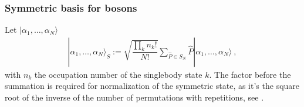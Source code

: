 \documentclass[letterpaper,10pt,english]{jupyterBook}
\begin{document}
\subsubsection{Symmetric basis for bosons}
\label{\detokenize{ch/quantum-mechanics/many-body/identical-systems:symmetric-basis-for-bosons}}\label{\detokenize{ch/quantum-mechanics/many-body/identical-systems:quantum-mechanics-second-quantizazion-identical-symmetrization-bosons}}
\sphinxAtStartPar
Let \(| \alpha_1, \dots, \alpha_N \rangle\)
\begin{equation*}
\begin{split}| \alpha_1, \dots, \alpha_N \rangle_S := \sqrt{ \dfrac{\prod_k n_k!}{N!} } \sum_{\hat{P} \in S_N} \hat{P} | \alpha_1, \dots, \alpha_N \rangle \ ,\end{split}
\end{equation*}
\sphinxAtStartPar
with \(n_k\) the occupation number of the single\sphinxhyphen{}body state \(k\). The factor before the summation is required for normalization of the symmetric state, as it’s the square root of the inverse of the number of permutations with repetitions, see .
\label{ch/quantum-mechanics/many-body/identical-systems:example-0}
\end{document}
